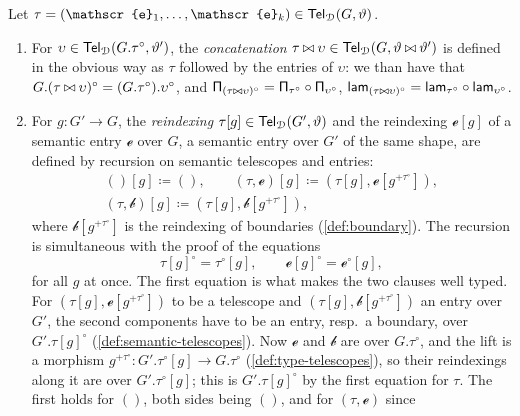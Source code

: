 \begin{definition}\label{def:semantic-operations}
    Let $\tau = (\mathscr{e}_1, \ldots, \mathscr{e}_k) \in \Tel_{\cat{D}}(G, \vartheta)$.
    \begin{enumerate}
        \item For $\upsilon \in \mathsf{Tel}_{\mathcal{D}}(G.\tau^{\circ}, \vartheta')$, the \emph{concatenation} $\tau \mathbin{\bowtie} \upsilon \in \mathsf{Tel}_{\mathcal{D}}(G, \vartheta \mathbin{\bowtie} \vartheta')$ is defined in the obvious way as $\tau$ followed by the entries of $\upsilon$: we than have that $G.(\tau \mathbin{\bowtie} \upsilon)^{\circ} = (G.\tau^{\circ}).\upsilon^{\circ}$, and $\mathsf{\Pi}_{(\tau \mathbin{\bowtie} \upsilon)^{\circ}} = \mathsf{\Pi}_{\tau^{\circ}} \circ \mathsf{\Pi}_{\upsilon^{\circ}}$, $\mathsf{lam}_{(\tau \mathbin{\bowtie} \upsilon)^{\circ}} = \mathsf{lam}_{\tau^{\circ}} \circ \mathsf{lam}_{\upsilon^{\circ}}$.
        \item For $g : G' \to G$, the \emph{reindexing} $\tau[g] \in \mathsf{Tel}_{\mathcal{D}}(G', \vartheta)$ and the reindexing $\mathscr{e}[g]$ of a semantic entry $\mathscr{e}$ over $G$, a semantic entry over $G'$ of the same shape, are defined by recursion on semantic telescopes and entries:
        \begin{gather*}
            ()[g] \coloneqq (), \qquad (\tau, \mathscr{e})[g] \coloneqq (\tau[g], \mathscr{e}[g^{+\tau^{\circ}}]),\\
            (\tau, \mathscr{b})[g] \coloneqq (\tau[g], \mathscr{b}[g^{+\tau^{\circ}}]),
        \end{gather*}
        where $\mathscr{b}[g^{+\tau^{\circ}}]$ is the reindexing of boundaries (\cref{def:boundary}). The recursion is simultaneous with the proof of the equations
        \[
            \tau[g]^{\circ} = \tau^{\circ}[g], \qquad \mathscr{e}[g]^{\circ} = \mathscr{e}^{\circ}[g],
        \]
        for all $g$ at once. The first equation is what makes the two clauses well typed. For $(\tau[g], \mathscr{e}[g^{+\tau^{\circ}}])$ to be a telescope and $(\tau[g], \mathscr{b}[g^{+\tau^{\circ}}])$ an entry over $G'$, the second components have to be an entry, resp.\ a boundary, over $G'.\tau[g]^{\circ}$ (\cref{def:semantic-telescopes}). Now $\mathscr{e}$ and $\mathscr{b}$ are over $G.\tau^{\circ}$, and the lift is a morphism $g^{+\tau^{\circ}} : G'.\tau^{\circ}[g] \to G.\tau^{\circ}$ (\cref{def:type-telescopes}), so their reindexings along it are over $G'.\tau^{\circ}[g]$; this is $G'.\tau[g]^{\circ}$ by the first equation for $\tau$. The first holds for $()$, both sides being $()$, and for $(\tau, \mathscr{e})$ since
        \begin{align*}

\end{align*}
\end{enumerate}
\end{definition}
